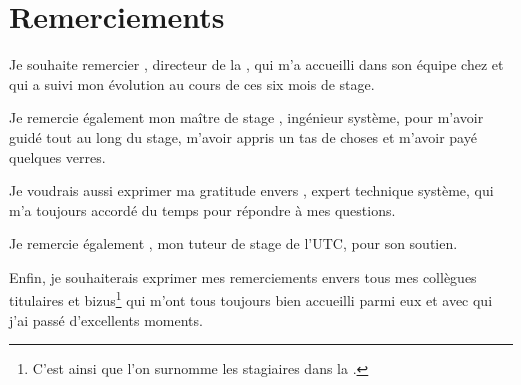\section*{Remerciements}

Je souhaite remercier \apakou, directeur de la \abusys, qui m'a accueilli dans son équipe chez \asmile{} et qui a suivi mon évolution au cours de ces six mois de stage.

Je remercie également mon maître de stage \agulet, ingénieur système, pour m'avoir guidé tout au
long du stage, m'avoir appris un tas de choses et m'avoir payé quelques verres.

Je voudrais aussi exprimer ma gratitude envers \amabes, expert technique système, qui m'a toujours accordé du temps pour répondre à mes questions.

Je remercie également \asuiveur, mon tuteur de stage de l'UTC, pour son soutien.

Enfin, je souhaiterais exprimer mes remerciements envers tous mes collègues titulaires et bizus\footnote{C'est ainsi que l'on surnomme les stagiaires dans la \abusys.} qui m'ont tous toujours bien accueilli parmi eux et avec qui j'ai passé d'excellents moments.

